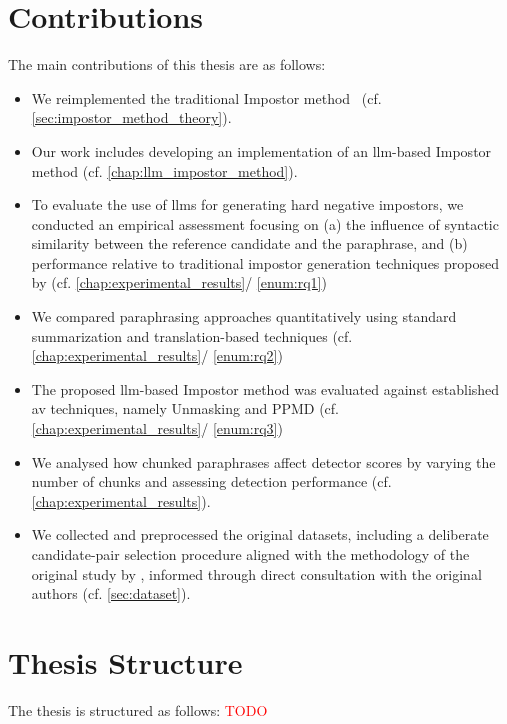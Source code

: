 


\section{Contributions}
\label{sec:contributions}
The main contributions of this thesis are as follows:
\begin{itemize}
    \item We reimplemented the traditional Impostor method~\citep{koppel_determining_2014} (cf. \autoref{sec:impostor_method_theory}).
    \item Our work includes developing an implementation of an \ac{llm}-based Impostor method (cf. \autoref{chap:llm_impostor_method}). 
    \item To evaluate the use of \acp{llm} for generating hard negative impostors, we conducted an empirical assessment focusing on (a) the influence of syntactic similarity between the reference candidate and the paraphrase, and (b) performance relative to traditional impostor generation techniques proposed by \citet{koppel_determining_2014} (cf. \autoref{chap:experimental_results}/ \ref{enum:rq1})
    \item We compared paraphrasing approaches quantitatively using standard summarization and translation-based techniques (cf. \autoref{chap:experimental_results}/ \ref{enum:rq2})
    \item The proposed \ac{llm}-based Impostor method was evaluated against established \ac{av} techniques, namely Unmasking and PPMD (cf. \autoref{chap:experimental_results}/ \ref{enum:rq3})
    \item We analysed how chunked paraphrases affect detector scores by varying the number of chunks and assessing detection performance (cf. \autoref{chap:experimental_results}).
    \item We collected and preprocessed the original datasets, including a deliberate candidate-pair selection procedure aligned with the methodology of the original study by \citet{koppel_determining_2014}, informed through direct consultation with the original authors (cf. \autoref{sec:dataset}).
\end{itemize}


\section{Thesis Structure}
\label{sec:thesis_structure}
The thesis is structured as follows:
\textcolor{red}{TODO}